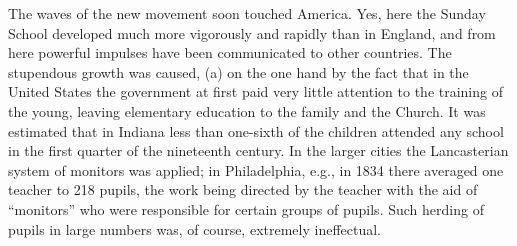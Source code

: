 The waves of the new movement soon touched America. Yes, here the Sunday School developed much more vigorously and rapidly than in England, and from here powerful impulses have been communicated to other countries. The stupendous growth was caused, (a) on the one hand by the fact that in the United States the government at first paid very little attention to the training of the young, leaving elementary education to the family and the Church. It was estimated that in Indiana less than one-sixth of the children attended any school in the first quarter of the nineteenth century. In the larger cities the Lancasterian system of monitors was applied; in Philadelphia, e.g., in 1834 there averaged one teacher to 218 pupils, the work being directed by the teacher with the aid of “monitors” who were responsible for certain groups of pupils. Such herding of pupils in large numbers was, of course, extremely ineffectual.
